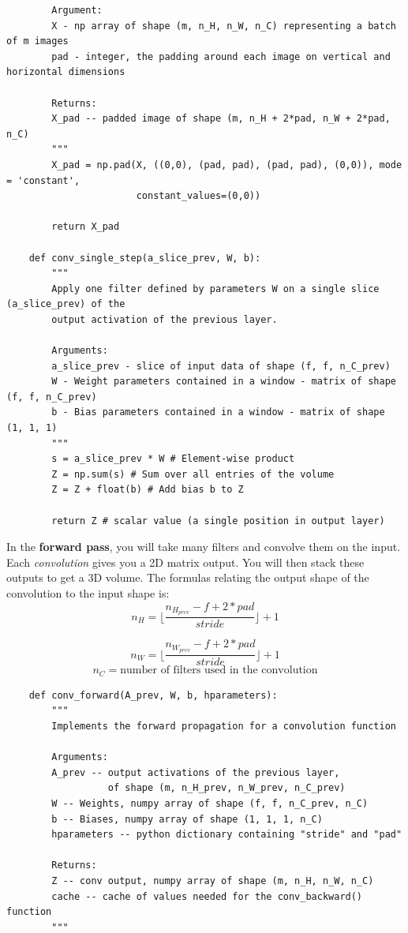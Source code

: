 \documentclass[11pt, a4paper]{article}
\begin{document}
\begin{spacing}{1.1}
\begin{lstlisting}
		Argument:
		X - np array of shape (m, n_H, n_W, n_C) representing a batch of m images
		pad - integer, the padding around each image on vertical and horizontal dimensions
		
		Returns:
		X_pad -- padded image of shape (m, n_H + 2*pad, n_W + 2*pad, n_C)
		"""
		X_pad = np.pad(X, ((0,0), (pad, pad), (pad, pad), (0,0)), mode = 'constant', 
		               constant_values=(0,0))
		
		return X_pad 
		
	def conv_single_step(a_slice_prev, W, b):
		"""
		Apply one filter defined by parameters W on a single slice (a_slice_prev) of the 
		output activation of the previous layer.
		
		Arguments:
		a_slice_prev - slice of input data of shape (f, f, n_C_prev)
		W - Weight parameters contained in a window - matrix of shape (f, f, n_C_prev)
		b - Bias parameters contained in a window - matrix of shape (1, 1, 1)
		"""
		s = a_slice_prev * W # Element-wise product
		Z = np.sum(s) # Sum over all entries of the volume
		Z = Z + float(b) # Add bias b to Z
		
		return Z # scalar value (a single position in output layer) \end{lstlisting} \vspace*{1mm}
	In the \textbf{forward pass}, you will take many filters and convolve them on the input. Each \textit{convolution} gives you a 2D matrix output. You will then stack these outputs to get a 3D volume. The formulas relating the output shape of the convolution to the input shape is:
	$$ n_H = \lfloor \frac{n_{H_{prev}} - f + 2*pad}{stride} \rfloor +1 $$ \newpage

	$$ n_W = \lfloor \frac{n_{W_{prev}} - f + 2*pad}{stride} \rfloor +1 $$
	$$ n_C = \text{number of filters used in the convolution}$$
	\begin{lstlisting}
	def conv_forward(A_prev, W, b, hparameters):
		"""
		Implements the forward propagation for a convolution function
		
		Arguments:
		A_prev -- output activations of the previous layer, 
		          of shape (m, n_H_prev, n_W_prev, n_C_prev)
		W -- Weights, numpy array of shape (f, f, n_C_prev, n_C)
		b -- Biases, numpy array of shape (1, 1, 1, n_C)
		hparameters -- python dictionary containing "stride" and "pad"
		
		Returns:
		Z -- conv output, numpy array of shape (m, n_H, n_W, n_C)
		cache -- cache of values needed for the conv_backward() function
		"""
		 

\end{lstlisting}
\end{spacing}
\end{document}
